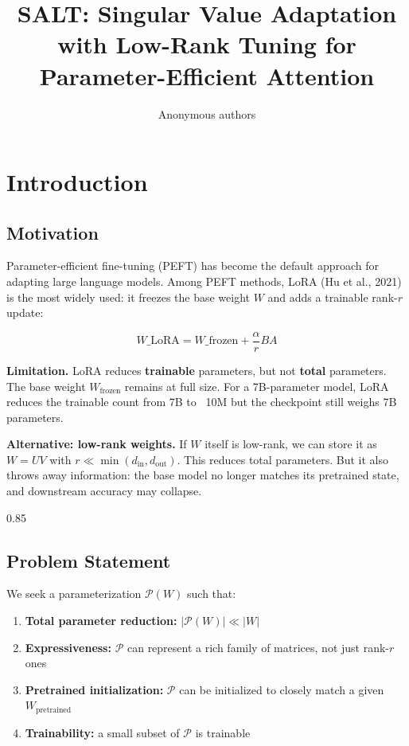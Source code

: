 \title{\textbf{SALT: Singular Value Adaptation with Low-Rank Tuning for Parameter-Efficient Attention}}

\author{Anonymous authors}



\section{Introduction}

\subsection{Motivation}

Parameter-efficient fine-tuning (PEFT) has become the default approach for 
adapting large language models. Among PEFT methods, LoRA (Hu et al., 2021) 
is the most widely used: it freezes the base weight $W$ and adds a trainable 
rank-$r$ update:

\[
W\_\text{LoRA} = W\_\text{frozen} + \frac{\alpha}{r} B A
\tag{1.1}
\]

\textbf{Limitation.} LoRA reduces \textbf{trainable} parameters, but not \textbf{total} 
parameters. The base weight $W_\text{frozen}$ remains at full size. For a 
7B-parameter model, LoRA reduces the trainable count from 7B to ~10M but 
the checkpoint still weighs 7B parameters.

\textbf{Alternative: low-rank weights.} If $W$ itself is low-rank, we can store 
it as $W = U V$ with $r \ll \min(d_\text{in}, d_\text{out})$. This reduces 
total parameters. But it also throws away information: the base model no 
longer matches its pretrained state, and downstream accuracy may collapse.

0.85


\subsection{Problem Statement}

We seek a parameterization $\mathcal{P}(W)$ such that:

\begin{enumerate}
\item \textbf{Total parameter reduction:} $|\mathcal{P}(W)| \ll |W|$
\item \textbf{Expressiveness:} $\mathcal{P}$ can represent a rich family of matrices,
  not just rank-$r$ ones
\item \textbf{Pretrained initialization:} $\mathcal{P}$ can be initialized to closely
  match a given $W_\text{pretrained}$
\item \textbf{Trainability:} a small subset of $\mathcal{P}$ is trainable

\end{enumerate}
